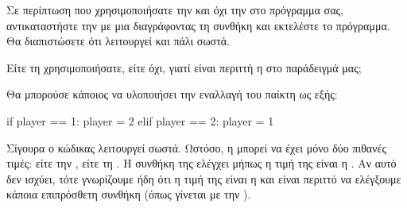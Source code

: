 \documentclass[a4paper,11pt,oneside]{book}
\begin{document}
\begin{step}
Σε περίπτωση που χρησιμοποιήσατε την  και όχι την  στο πρόγραμμα σας, αντικαταστήστε την με μια  διαγράφοντας τη συνθήκη και εκτελέστε το πρόγραμμα. Θα διαπιστώσετε ότι λειτουργεί και πάλι σωστά.

Είτε τη χρησιμοποιήσατε, είτε όχι, γιατί είναι περιττή η  στο παράδειγμά μας;

\begin{answer}
Θα μπορούσε κάποιος να υλοποιήσει την εναλλαγή του παίκτη ως εξής:

\begin{pyplain}
    if player == 1:
        player = 2
    elif player == 2:
        player = 1
\end{pyplain}

Σίγουρα ο κώδικας λειτουργεί σωστά. 
Ωστόσο, η  μπορεί να έχει μόνο δύο πιθανές τιμές: είτε την , είτε τη . Η συνθήκη της  ελέγχει μήπως η τιμή της  είναι η . Αν αυτό δεν ισχύει, τότε γνωρίζουμε ήδη ότι η τιμή της  είναι η  και είναι περιττό να ελέγξουμε κάποια επιπρόσθετη συνθήκη (όπως γίνεται με την ).
\end{answer}
\end{step}
\end{document}
